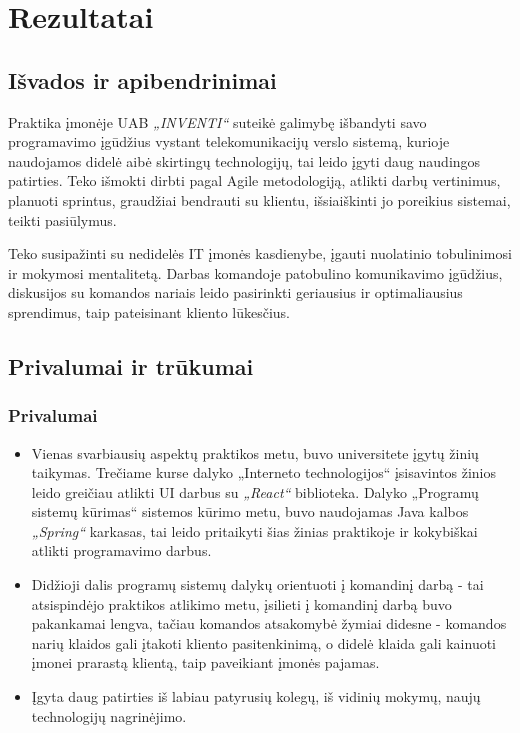 \section{Rezultatai}

\subsection{Išvados ir apibendrinimai}

Praktika įmonėje UAB \textit{„INVENTI“} suteikė galimybę išbandyti savo programavimo įgūdžius vystant telekomunikacijų verslo sistemą,
kurioje naudojamos didelė aibė skirtingų technologijų, tai leido įgyti daug naudingos patirties. Teko išmokti dirbti pagal Agile metodologiją,
atlikti darbų vertinimus, planuoti sprintus, graudžiai bendrauti su klientu, išsiaiškinti jo poreikius sistemai, teikti pasiūlymus.

Teko susipažinti su nedidelės IT įmonės kasdienybe, įgauti nuolatinio tobulinimosi ir mokymosi mentalitetą. Darbas komandoje patobulino komunikavimo įgūdžius,
diskusijos su komandos nariais leido pasirinkti geriausius ir optimaliausius sprendimus, taip pateisinant kliento lūkesčius.

\subsection{Privalumai ir trūkumai}

\subsubsection{Privalumai}

\begin{itemize}
    \item Vienas svarbiausių aspektų praktikos metu, buvo universitete įgytų žinių taikymas. Trečiame kurse dalyko „Interneto technologijos“ įsisavintos žinios leido greičiau
    atlikti UI darbus su \textit{„React“} biblioteka. Dalyko „Programų sistemų kūrimas“ sistemos kūrimo metu, buvo naudojamas Java kalbos \textit{„Spring“} karkasas, tai
    leido pritaikyti šias žinias praktikoje ir kokybiškai atlikti programavimo darbus.
    \item Didžioji dalis programų sistemų dalykų orientuoti į komandinį darbą - tai atsispindėjo praktikos atlikimo metu, įsilieti į komandinį darbą buvo pakankamai lengva,
    tačiau komandos atsakomybė žymiai didesne - komandos narių klaidos gali įtakoti kliento pasitenkinimą, o didelė klaida gali kainuoti įmonei prarastą klientą, taip paveikiant
    įmonės pajamas.
    \item Įgyta daug patirties iš labiau patyrusių kolegų, iš vidinių mokymų, naujų technologijų nagrinėjimo.
\end{itemize}

